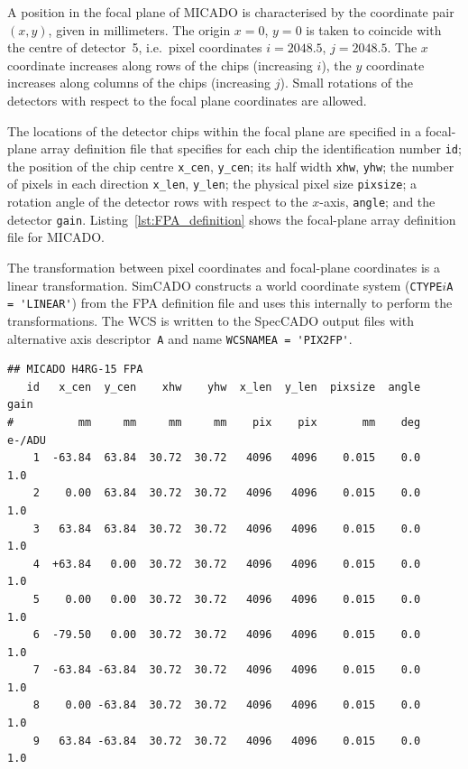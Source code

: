 \documentclass[a4paper,twoside,11pt]{article}
\newcommand{\micron}{\upmu\mathrm{m}}
\begin{document}
A position in the focal plane of MICADO is characterised by the
coordinate pair $(x, y)$, given in millimeters. The origin $x=0$,
$y=0$ is taken to coincide with the centre of detector~5, i.e.~pixel
coordinates $i=2048.5$, $j=2048.5$. The $x$ coordinate increases along
rows of the chips (increasing $i$), the $y$ coordinate increases along
columns of the chips (increasing $j$). Small rotations of the
detectors with respect to the focal plane coordinates are allowed.

The locations of the detector chips within the focal plane are
specified in a focal-plane array definition file that specifies for
each chip the identification number \lstinline{id}; the position of
the chip centre \lstinline{x_cen}, \lstinline{y_cen}; its half width
\lstinline{xhw}, \lstinline{yhw}; the number of pixels in each
direction \lstinline{x_len}, \lstinline{y_len}; the physical pixel
size \lstinline{pixsize}; a rotation angle of the detector rows with
respect to the $x$-axis, \lstinline{angle}; and the detector
\lstinline{gain}.  Listing~\ref{lst:FPA_definition} shows the
focal-plane array definition file for MICADO.

The transformation between pixel coordinates and focal-plane
coordinates is a linear transformation. SimCADO constructs a world
coordinate system (\lstinline{CTYPE}$i$\lstinline{A = 'LINEAR'}) from
the FPA definition file and uses this internally to perform the
transformations. The WCS is written to the SpecCADO output files with
alternative axis descriptor~\lstinline{A} and name
\lstinline{WCSNAMEA = 'PIX2FP'}.


\begin{lstlisting}[style=csh,float, caption=Focal plane array definition file for MICADO with nine HAWAII4RG chips with $15\,\micron$ pixels, label=lst:FPA_definition]
## MICADO H4RG-15 FPA
   id   x_cen  y_cen    xhw    yhw  x_len  y_len  pixsize  angle    gain
#          mm     mm     mm     mm    pix    pix       mm    deg  e-/ADU
    1  -63.84  63.84  30.72  30.72   4096   4096    0.015    0.0     1.0
    2    0.00  63.84  30.72  30.72   4096   4096    0.015    0.0     1.0
    3   63.84  63.84  30.72  30.72   4096   4096    0.015    0.0     1.0
    4  +63.84   0.00  30.72  30.72   4096   4096    0.015    0.0     1.0
    5    0.00   0.00  30.72  30.72   4096   4096    0.015    0.0     1.0
    6  -79.50   0.00  30.72  30.72   4096   4096    0.015    0.0     1.0
    7  -63.84 -63.84  30.72  30.72   4096   4096    0.015    0.0     1.0
    8    0.00 -63.84  30.72  30.72   4096   4096    0.015    0.0     1.0
    9   63.84 -63.84  30.72  30.72   4096   4096    0.015    0.0     1.0
\end{lstlisting}
\end{document}
